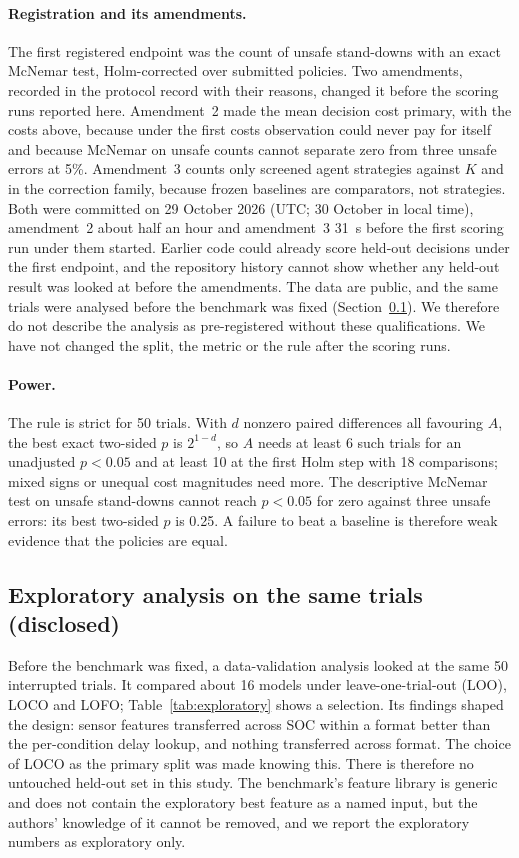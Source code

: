 \documentclass[11pt]{article}
\begin{document}
\paragraph{Registration and its amendments.} The first registered endpoint was the count of unsafe stand-downs with an
exact McNemar test, Holm-corrected over submitted policies. Two amendments, recorded in the protocol record with their
reasons, changed it before the scoring runs reported here. Amendment~2 made the mean decision cost primary, with the
costs above, because under the first costs observation could never pay for itself and because McNemar on unsafe
counts cannot separate zero from three unsafe errors at 5\%. Amendment~3 counts only screened agent strategies
against $K$ and in the correction family, because frozen baselines are comparators, not strategies. Both were
committed on 29 October 2026 (UTC; 30 October in local time), amendment~2 about half an hour and amendment~3 31~s before the first scoring run under
them started. Earlier code could already score held-out decisions under the first endpoint, and the repository
history cannot show whether any held-out result was looked at before the amendments. The data are public, and the same
trials were analysed before the benchmark was fixed (Section~\ref{sec:exploratory}). We therefore do not describe the
analysis as pre-registered without these qualifications. We have not changed the split, the metric or the rule after
the scoring runs.

\paragraph{Power.} The rule is strict for 50 trials. With $d$ nonzero paired differences all favouring $A$, the best
exact two-sided $p$ is $2^{1-d}$, so $A$ needs at least 6 such trials for an unadjusted $p<0.05$ and at least 10 at
the first Holm step with 18 comparisons; mixed signs or unequal cost magnitudes need more. The descriptive McNemar test
on unsafe stand-downs cannot reach $p<0.05$ for zero against three unsafe errors: its best two-sided $p$ is 0.25. A
failure to beat a baseline is therefore weak evidence that the policies are equal.

\subsection{Exploratory analysis on the same trials (disclosed)}\label{sec:exploratory}
Before the benchmark was fixed, a data-validation analysis looked at the same 50 interrupted trials. It compared about
16 models under leave-one-trial-out (LOO), LOCO and LOFO; Table~\ref{tab:exploratory} shows a selection. Its findings
shaped the design: sensor features transferred across SOC within a format better than the per-condition delay lookup,
and nothing transferred across format. The choice of LOCO as the primary split was made knowing this. There is
therefore no untouched held-out set in this study. The benchmark's feature library is generic and does not contain the
exploratory best feature as a named input, but the authors' knowledge of it cannot be removed, and we report the
exploratory numbers as exploratory only.
\end{document}
